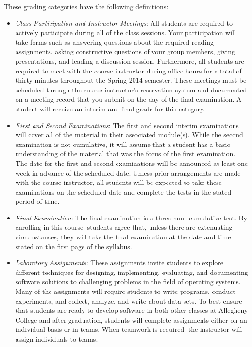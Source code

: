 \newpage
\noindent
These grading categories have the following definitions:
\vspace*{-.1in}

\begin{itemize}

    \item {\em Class Participation and Instructor Meetings}: All students are required to actively participate
      during all of the class sessions. Your participation will take forms such as answering questions about the
      required reading assignments, asking constructive questions of your group members, giving presentations, and
      leading a discussion session. Furthermore, all students are required to meet with the course instructor during
      office hours for a total of thirty minutes throughout the Spring 2014 semester.  These meetings must be scheduled
      through the course instructor's reservation system and documented on a meeting record that you submit on the
      day of the final examination. A student will receive an interim and final grade for this category.

    \item {\em First and Second Examinations}: The first and second interim examinations will cover all of the material
      in their associated module(s).  While the second examination is not cumulative, it will assume that a student has a
      basic understanding of the material that was the focus of the first examination.  The date for the first and
      second examinations will be announced at least one week in advance of the scheduled date.  Unless prior
      arrangements are made with the course instructor, all students will be expected to take these examinations on the
      scheduled date and complete the tests in the stated period of time.

    \item {\em Final Examination}: The final examination is a three-hour cumulative test.  By enrolling in this
      course, students agree that, unless there are extenuating circumstances, they will take the final examination
      at the date and time stated on the first page of the syllabus.

    \item {\em Laboratory Assignments}: These assignments invite students to explore different techniques for
      designing, implementing, evaluating, and documenting software solutions to challenging problems in the field
      of operating systems.  Many of the assignments will require students to write programs, conduct experiments,
      and collect, analyze, and write about data sets.  To best ensure that students are ready to develop software
      in both other classes at Allegheny College and after graduation, students will complete assignments either on
      an individual basis or in teams.  When teamwork is required, the instructor will assign individuals to teams.


\end{itemize}
